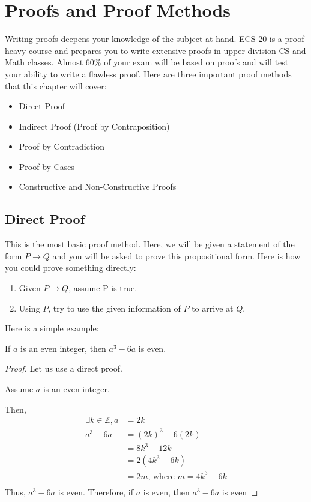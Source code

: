 \chapter{Proofs and Proof Methods}
Writing proofs deepens your knowledge of the subject at hand. ECS 20 is a proof
heavy course and prepares you to write extensive proofs in upper division CS
and Math classes. Almost 60\% of your exam will be based on proofs and will
test your ability to write a flawless proof. Here are three important proof
methods that this chapter will cover:

\begin{itemize}
    \item Direct Proof
    \item Indirect Proof (Proof by Contraposition)
    \item Proof by Contradiction
    \item Proof by Cases
    \item Constructive and Non-Constructive Proofs
\end{itemize}

\section{Direct Proof}
This is the most basic proof method. Here, we will be given a statement of the
form $ P \rightarrow Q $ and you will be asked to prove this propositional
form. Here is how you could prove something directly:

\begin{enumerate}[label=\textbf{Step \arabic*},leftmargin=*]
    \item Given $P \rightarrow Q$, assume P is true.
    \item Using $P$, try to use the given information of $P$ to arrive at $Q$.
\end{enumerate}

Here is a simple example:

\begin{theorem}
    If $a$ is an even integer, then $a^{3} - 6a$ is even.
\end{theorem}

\begin{proof}
    Let us use a direct proof.

    Assume $a$ is an even integer.

    Then,
    \[
        \begin{split}
            \exists k \in \mathbb{Z}, a &= 2k \\
            a^{3} - 6a &= (2k)^{3} - 6(2k) \\
            &= 8k^{3} - 12k \\
            &= 2(4k^{3} - 6k) \\
            &= 2m\text{, where } m = 4k^{3} - 6k \\
        \end{split}
    \]
    Thus, $a^3 - 6a$ is even. Therefore, if $a$ is even, then $a^{3} -6a$ is even
\end{proof}

